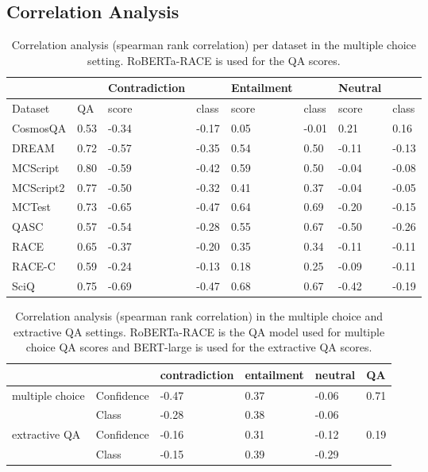 \documentclass[11pt]{article}
\begin{document}
\subsection{Correlation Analysis}
\begin{table*}[]
\centering
\begin{tabular}{llllllll}
\hline
 &  & Contradiction &  & Entailment &  & Neutral &  \\ \hline
Dataset & QA & score & class & score & class & score & class \\
CosmosQA & 0.53 & -0.34 & -0.17 & 0.05 & -0.01 & 0.21 & 0.16 \\
DREAM & 0.72 & -0.57 & -0.35 & 0.54 & 0.50 & -0.11 & -0.13 \\
MCScript & 0.80 & -0.59 & -0.42 & 0.59 & 0.50 & -0.04 & -0.08 \\
MCScript2 & 0.77 & -0.50 & -0.32 & 0.41 & 0.37 & -0.04 & -0.05 \\
MCTest & 0.73 & -0.65 & -0.47 & 0.64 & 0.69 & -0.20 & -0.15 \\
QASC & 0.57 & -0.54 & -0.28 & 0.55 & 0.67 & -0.50 & -0.26 \\
RACE & 0.65 & -0.37 & -0.20 & 0.35 & 0.34 & -0.11 & -0.11 \\
RACE-C & 0.59 & -0.24 & -0.13 & 0.18 & 0.25 & -0.09 & -0.11 \\
SciQ & 0.75 & -0.69 & -0.47 & 0.68 & 0.67 & -0.42 & -0.19 \\ \hline
\end{tabular}
\caption{Correlation analysis (spearman rank correlation) per dataset in the multiple choice setting. RoBERTa-RACE is used for the QA scores.}
\label{tab:per_dataset_correlation}
\end{table*}
\begin{table*}[]
\centering
\begin{tabular}{llllll}
\hline
 &  & contradiction & entailment & neutral & QA \\ \hline
multiple choice & Confidence & -0.47 & 0.37 & -0.06 & 0.71 \\
 & Class & -0.28 & 0.38 & -0.06 &  \\
extractive QA & Confidence & -0.16 & 0.31 & -0.12 & 0.19 \\
 & Class & -0.15 & 0.39 & -0.29 &  \\ \hline
\end{tabular}
\caption{Correlation analysis (spearman rank correlation) in the multiple choice and extractive QA settings. RoBERTa-RACE is the QA model used for multiple choice QA scores and BERT-large is used for the extractive QA scores.}
\label{tab:correlation}
\end{table*}
\end{document}
